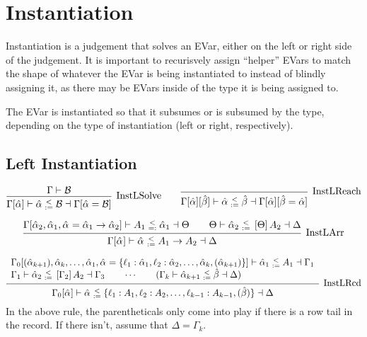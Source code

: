 \documentclass{article}
\newcommand{\B}{\mathcal{B}}
\newcommand{\instLSymbol}{\;\substack{<\\:=}\;}
\newcommand{\instRSymbol}{\;\substack{<\\=:}\;}
\newcommand{\ev}{\hat}
\newcommand{\spc}{\qquad}
\newcommand{\apply}[1]{\left[#1\right]}
\newcommand{\eva}[1][]{\ev \alpha_{#1}}
\newcommand{\evb}{\ev \beta}
\newcommand{\instL}[4]{#1 \vdash #2 \instLSymbol #3 \dashv #4}
\newcommand{\instR}[4]{#1 \vdash #2 \instRSymbol #3 \dashv #4}
\newcommand{\lookup}[5]{#1 \vdash #2 \# #3 \longrightarrow #4 \dashv #5}
\newcommand{\deduct}[3][]
{
  \begin{prooftree}
    \hypo{#2}
    \infer1[\text{#1}]{#3}
  \end{prooftree}
}
\begin{document}

\section{Instantiation}

Instantiation is a judgement that solves an EVar, either on the left or right
side of the judgement. It is important to recurisvely assign ``helper'' EVars to
match the shape of whatever the EVar is being instantiated to instead of blindly
assigning it, as there may be EVars inside of the type it is being assigned to.

The EVar is instantiated so that it subsumes or is subsumed by the type,
depending on the type of instantiation (left or right, respectively).

\subsection{Left Instantiation}

\[
  \deduct[InstLSolve]
  {\Gamma \vdash \B}
  {\instL{\Gamma[\ev\alpha]}{\ev \alpha}{\B}{\Gamma[\ev\alpha = \B]}}
  \spc
  \deduct[InstLReach]
  {}
  {\instL{\Gamma[\ev\alpha][\ev\beta]}{\ev \alpha}{\ev
      \beta}{\Gamma[\ev\alpha][\ev\beta = \ev\alpha]}}
\]

\[
  \deduct[InstLArr] {\instR{\Gamma[\eva[2], \eva[1], \eva = \eva[1] \to
      \eva[2]]}{A_1}{\eva[1]}{\Theta} \spc \instL{\Theta}{\eva[2]}{\apply \Theta
      A_2}{\Delta} } {\instL{\Gamma[\eva]}{\eva}{A_1 \to A_2}{\Delta}}
\]

\[
  \deduct[InstLRcd]
  {
    \begin{array}{l}
     \instL{\Gamma_0[(\eva[k+1]), \eva[k], \dots, \eva[1], \eva=\{\ell_1 : \eva[1],
      \ell_2 : \eva[2], \dots, \eva[k], (\eva[k+1])\}]}{\eva[1]}{A_1}{\Gamma_1} \\
    \instL{\Gamma_1}{\eva[2]}{\apply{\Gamma_2} A_2}{\Gamma_3} \spc \cdots \spc
     (\instL{\Gamma_k}{\eva[k+1]}{\evb}{\Delta})
  \end{array}
  }
  {\instL{\Gamma_0[\eva]}{\eva}{\{\ell_1:A_1, \ell_2 : A_2, \dots, \ell_{k-1} : A_{k-1}, (\evb)\}}{\Delta}}
\]
In the above rule, the parentheticals only come into play if there is a row tail
in the record. If there isn't, assume that \(\Delta = \Gamma_k\).
\end{document}
